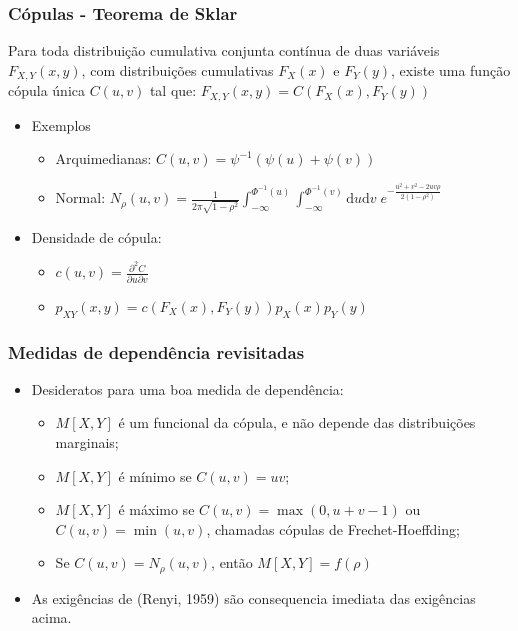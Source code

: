 \documentclass[ignorenonframetext,]{beamer}
\begin{document}
\begin{frame}\frametitle{Cópulas - Teorema de Sklar}

Para toda distribuição cumulativa conjunta contínua de duas variáveis
$F_{X,Y}(x,y)$, com distribuições cumulativas $F_X(x)$ e $F_Y(y)$,
existe uma função cópula única $C(u, v)$ tal que:
$F_{X,Y}(x,y) = C(F_X(x), F_Y(y))$

\begin{itemize}
\itemsep1pt\parskip0pt
\item
  Exemplos

  \begin{itemize}
  \itemsep1pt\parskip0pt
  \item
    Arquimedianas: $C(u,v) = \psi^{-1}(\psi(u) + \psi(v))$
  \item
    Normal:
    $N_{\rho}(u,v) = \frac{1}{2\pi\sqrt{1 - \rho^2}}\int_{-\infty}^{\Phi^{-1}(u)} \int_{-\infty}^{\Phi^{-1}(v)} \mathrm{d} u \mathrm{d} v\; e^{-\frac{u^2 + v^2 - 2uv\rho}{2(1-\rho^2)}}$
  \end{itemize}
\item
  Densidade de cópula:

  \begin{itemize}
  \itemsep1pt\parskip0pt
  \item
    $c(u,v)=\frac{\partial^2 C}{\partial u\partial v}$
  \item
    $p_{XY}(x,y)=c(F_X(x),F_Y(y))p_X(x)p_Y(y)$
  \end{itemize}
\end{itemize}

\end{frame}

\begin{frame}\frametitle{Medidas de dependência revisitadas}

\begin{itemize}
\itemsep1pt\parskip0pt
\item
  Desideratos para uma boa medida de dependência:

  \begin{itemize}
  \itemsep1pt\parskip0pt
  \item
    $M[X,Y]$ é um funcional da cópula, e não depende das distribuições
    marginais;
  \item
    $M[X,Y]$ é mínimo se $C(u,v) = uv$;
  \item
    $M[X,Y]$ é máximo se $C(u,v) = \max(0,u+v-1)$ ou $C(u,v)=\min(u,v)$,
    chamadas cópulas de Frechet-Hoeffding;
  \item
    Se $C(u,v) = N_\rho(u,v)$, então $M[X,Y] = f(\rho)$
  \end{itemize}
\item
  As exigências de (Renyi, 1959) são consequencia imediata das
  exigências acima.
\end{itemize}

\end{frame}
\end{document}

